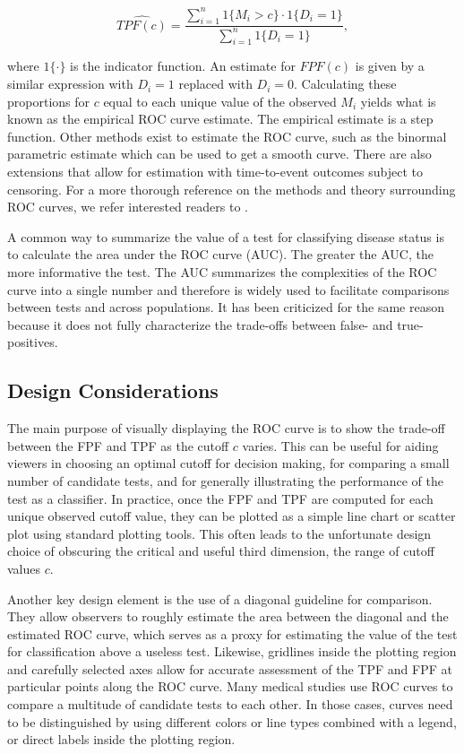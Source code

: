 \documentclass[article]{jss}
\begin{document}
\[ \widehat{TPF(c)} = \frac{\sum_{i = 1}^n 1\{M_i > c\} \cdot 1\{D_i = 1\}}{\sum_{i=1}^n 1\{D_i = 1\}}, \]

where \(1\{\cdot\}\) is the indicator function. An estimate for
\(FPF(c)\) is given by a similar expression with \(D_i = 1\) replaced
with \(D_i = 0\). Calculating these proportions for \(c\) equal to each
unique value of the observed \(M_i\) yields what is known as the
empirical ROC curve estimate. The empirical estimate is a step function.
Other methods exist to estimate the ROC curve, such as the binormal
parametric estimate which can be used to get a smooth curve. There are
also extensions that allow for estimation with time-to-event outcomes
subject to censoring. For a more thorough reference on the methods and
theory surrounding ROC curves, we refer interested readers to
\citet{pepe2003statistical}.

A common way to summarize the value of a test for classifying disease
status is to calculate the area under the ROC curve (AUC). The greater
the AUC, the more informative the test. The AUC summarizes the
complexities of the ROC curve into a single number and therefore is
widely used to facilitate comparisons between tests and across
populations. It has been criticized for the same reason because it does
not fully characterize the trade-offs between false- and true-positives.

\subsection{Design Considerations}\label{design-considerations}

The main purpose of visually displaying the ROC curve is to show the
trade-off between the FPF and TPF as the cutoff \(c\) varies. This can
be useful for aiding viewers in choosing an optimal cutoff for decision
making, for comparing a small number of candidate tests, and for
generally illustrating the performance of the test as a classifier. In
practice, once the FPF and TPF are computed for each unique observed
cutoff value, they can be plotted as a simple line chart or scatter plot
using standard plotting tools. This often leads to the unfortunate
design choice of obscuring the critical and useful third dimension, the
range of cutoff values \(c\).

Another key design element is the use of a diagonal guideline for
comparison. They allow observers to roughly estimate the area between
the diagonal and the estimated ROC curve, which serves as a proxy for
estimating the value of the test for classification above a useless
test. Likewise, gridlines inside the plotting region and carefully
selected axes allow for accurate assessment of the TPF and FPF at
particular points along the ROC curve. Many medical studies use ROC
curves to compare a multitude of candidate tests to each other. In those
cases, curves need to be distinguished by using different colors or line
types combined with a legend, or direct labels inside the plotting
region.
\end{document}
